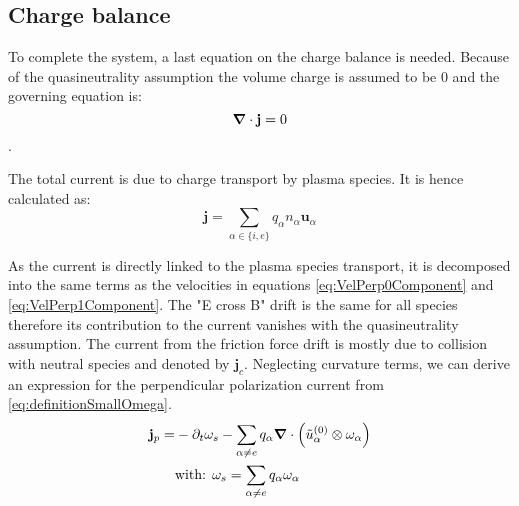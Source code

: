 \subsection{Charge balance}
To complete the system, a last equation on the charge balance is needed. Because of the quasineutrality assumption the volume charge is assumed to be 0 and the governing equation is: $$\grad\cdot\mathbf{j} = 0$$.

The total current is due to charge transport by plasma species. It is hence calculated as: 
\begin{equation}
	\mathbf{j} = \sum_{\alpha \in \{i,e\}} q_\alpha n_\alpha \mathbf{u}_\alpha
\end{equation}

As the current is directly linked to the plasma species transport, it is decomposed into the same terms as the velocities in equations \ref{eq:VelPerp0Component} and \ref{eq:VelPerp1Component}. The "E cross B" drift is the same for all species therefore its contribution to the current vanishes with the quasineutrality assumption. The current from the friction force drift is mostly due to collision with neutral species and denoted by $\mathbf{j}_{c}$. Neglecting curvature terms, we can derive an expression for the perpendicular polarization current from \autoref{eq:definitionSmallOmega}.
\begin{align}
	\mathbf{j}_{p} =& -\partial_t\mathbf{\omega}_s - \sum_{\alpha\neq e}q_\alpha\grad\cdot\left(\tilde{u}^{(0)}_\alpha\otimes\mathbf{\omega}_\alpha\right) \\
	&\text{with:  }\mathbf{\omega}_s = \sum_{\alpha\neq e}q_\alpha\mathbf{\omega}_\alpha \nonumber
\end{align}

